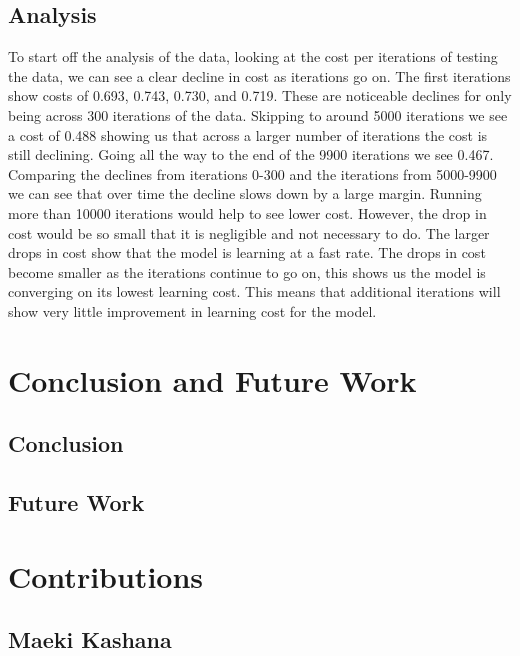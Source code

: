 \documentclass{IEEE}
\begin{document}
\subsection{Analysis}

To start off the analysis of the data, looking at the cost per iterations of testing the data, we can see a clear decline in cost as iterations go on. The first iterations show costs of 0.693, 0.743, 0.730, and 0.719. These are noticeable declines for only being across 300 iterations of the data. Skipping to around 5000 iterations we see a cost of 0.488 showing us that across a larger number of iterations the cost is still declining. Going all the way to the end of the 9900 iterations we see 0.467. Comparing the declines from iterations 0-300 and the iterations from 5000-9900 we can see that over time the decline slows down by a large margin. Running more than 10000 iterations would help to see lower cost. However, the drop in cost would be so small that it is negligible and not necessary to do. The larger drops in cost show that the model is learning at a fast rate. The drops in cost become smaller as the iterations continue to go on, this shows us the model is converging on its lowest learning cost. This means that additional iterations will show very little improvement in learning cost for the model.

\section{Conclusion and Future Work}

\subsection{Conclusion}

\subsection{Future Work}





\section{Contributions}

\subsection{Maeki Kashana}
\end{document}
